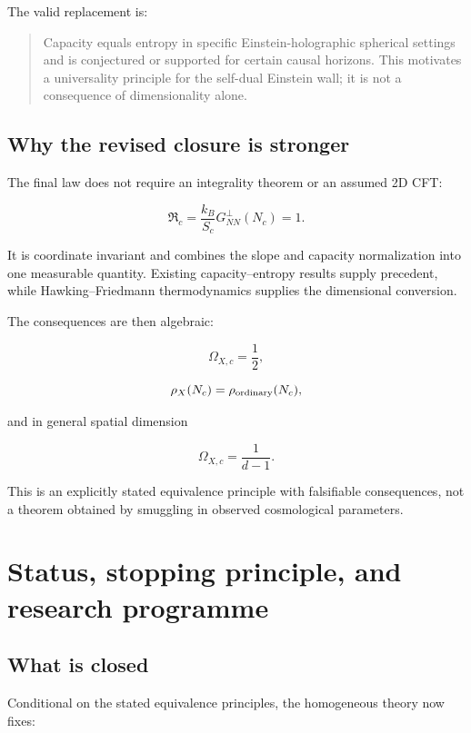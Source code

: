 \documentclass[
  11pt,
  letterpaper,
]{article}
\begin{document}
The valid replacement is:

\begin{quote}
Capacity equals entropy in specific Einstein-holographic spherical
settings and is conjectured or supported for certain causal horizons.
This motivates a universality principle for the self-dual Einstein wall;
it is not a consequence of dimensionality alone.
\end{quote}

\subsection{Why the revised closure is
stronger}\label{why-the-revised-closure-is-stronger}

The final law does not require an integrality theorem or an assumed 2D
CFT:

\[
\boxed{
\mathfrak R_c
=\frac{k_B}{S_c}G^{\perp}_{NN}(N_c)=1.
}
\]

It is coordinate invariant and combines the slope and capacity
normalization into one measurable quantity. Existing capacity--entropy
results supply precedent, while Hawking--Friedmann thermodynamics
supplies the dimensional conversion.

The consequences are then algebraic:

\[
\Omega_{X,c}=\frac12,
\]

\[
\rho_X(N_c)=\rho_{\rm ordinary}(N_c),
\]

and in general spatial dimension

\[
\Omega_{X,c}=\frac1{d-1}.
\]

This is an explicitly stated equivalence principle with falsifiable
consequences, not a theorem obtained by smuggling in observed
cosmological parameters.

\section{Status, stopping principle, and research
programme}\label{status-stopping-principle-and-research-programme}

\subsection{What is closed}\label{what-is-closed}

Conditional on the stated equivalence principles, the homogeneous theory
now fixes:
\end{document}
